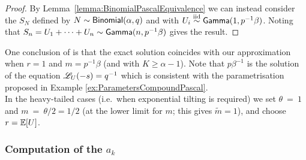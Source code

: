 \begin{proof}
By Lemma~\ref{lemma:BinomialPascalEquivalence} we can instead consider the $S_N$ defined by $N \sim \mathsf{Binomial}(\alpha,q)$ and with $U_i \overset{\smash{\mathrm{iid}}}{\sim} \mathsf{Gamma}(1,p^{-1} \beta)$.
Noting that $S_n = U_1 + \dots + U_n \sim \mathsf{Gamma}(n, p^{-1} \beta)$ gives the result.
\end{proof}
One conclusion of  is that the exact solution coincides with our approximation when $r=1$ and $m=p^{-1}\beta$ (and with $K \ge \alpha - 1$). Note that $p\beta^{-1}$ is the solution of the equation $\mathscr{L}_{U}(-s)=q^{-1}$ which is consistent with the parametrisation proposed in Example \ref{ex:ParametersCompoundPascal}.\\

In the heavy-tailed cases (i.e.\ when exponential tilting is required) we set $\theta~=~1$ and $m~=~\theta/2 = 1/2$ (at the lower limit for $m$; this gives $\widetilde{m}=1$), and choose $r = \operatorname{{\mathbb E}}[U]$.

\subsubsection{Computation of the $a_k$} \label{sssec:ComputingOrthogonalCoefficients}

